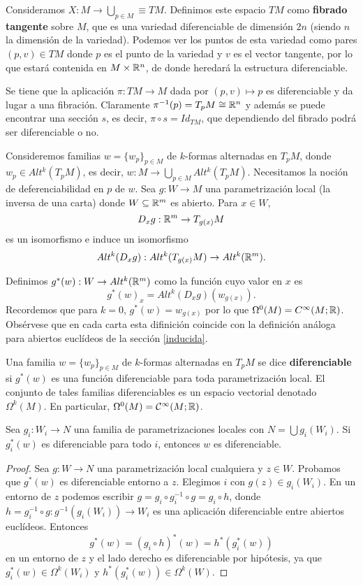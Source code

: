 \documentclass[CV.tex]{subfiles}
\begin{document}
\begin{defi}
Consideramos $X:M\to \bigcup_{p\in M}\equiv TM$. Definimos este espacio $TM$ como \textbf{fibrado tangente} sobre $M$, que es una variedad diferenciable de dimensión $2n$ (siendo $n$ la dimensión de la variedad). Podemos ver los puntos de esta variedad como pares $(p,v)\in TM$ donde $p$ es el punto de la variedad y $v$ es el vector tangente, por lo que estará contenida en $M\times \mathbb{R}^n$, de donde heredará la estructura diferenciable. 
\end{defi}

Se tiene que la aplicación $\pi :TM\to M$ dada por $(p,v)\mapsto p$ es diferenciable y da lugar a una fibración. Claramente $\pi^{-1}(p)=T_pM\cong\mathbb{R}^n$ y además se puede encontrar una sección $s$, es decir, $\pi\circ s=Id_{TM}$, que dependiendo del fibrado podrá ser diferenciable o no.

Consideremos familias $w=\{w_p\}_{p\in M}$ de $k$-formas alternadas en $T_pM$, donde $w_p\in Alt^k(T_pM)$, es decir, $w:M\to \bigcup_{p\in M}Alt^k(T_pM)$. Necesitamos la noción de deferenciabilidad en $p$ de $w$. Sea $g:W\to M$ una parametrización local (la inversa de una carta) donde $W\subseteq\mathbb{R}^m$ es abierto. Para $x\in W$,
\[
D_x g:\mathbb{R}^m\to T_{g(x)}M
\]
es un isomorfismo e induce un isomorfismo
\[
Alt^k(D_xg):Alt^k(T_{g(x)}M)\to Alt^k(\mathbb{R}^m).
\]

Definimos $g^*(w):W\to Alt^k(\mathbb{R}^m)$ como la función cuyo valor en $x$ es
\[
g^*(w)_x=Alt^k(D_xg)(w_{g(x)}).
\]
Recordemos que para $k=0$, $g^*(w)=w_{g(x)}$ por lo que $\Omega^0(M)=C^{\infty}(M;\mathbb{R})$. Obsérvese que en cada carta esta difinición coincide con la definición análoga para abiertos euclídeos de la sección \ref{inducida}.


\begin{defi}
Una familia $w=\{w_p\}_{p\in M}$ de $k$-formas alternadas en $T_pM$ se dice \textbf{diferenciable} si $g^*(w)$ es una función diferenciable para toda parametrización local. El conjunto de tales familias diferenciables es un espacio vectorial denotado $\Omega^k(M)$. En particular, $\Omega^0(M)=\mathcal{C}^{\infty}(M;\mathbb{R})$. 
\end{defi}

\begin{lemma}
Sea $g_i:W_i\to N$ una familia de parametrizaciones locales con $N=\bigcup g_i(W_i)$. Si $g_i^*(w)$ es diferenciable para todo $i$, entonces $w$ es diferenciable.
\end{lemma}
\begin{proof}
Sea $g:W\to N$ una parametrización local cualquiera y $z\in W$. Probamos que $g^*(w)$ es diferenciable entorno a $z$. Elegimos $i$ con $g(z)\in g_i(W_i)$. En un entorno de $z$ podemos escribir $g=g_i\circ g_i^{-1}\circ g=g_i\circ h$, donde $h=g_i^{-1}\circ g:g^{-1}(g_i(W_i))\to W_i$ es una aplicación diferenciable entre abiertos euclídeos. Entonces
\[
g^*(w)=(g_i\circ h)^*(w)=h^*(g_i^*(w))
\]
en un entorno de $z$ y el lado derecho es diferenciable por hipótesis, ya que $ g_i^*(w)\in\Omega^k(W_i)$ y $h^*(g_i^*(w))\in\Omega^k(W)$. 
\end{proof}
\end{document}

